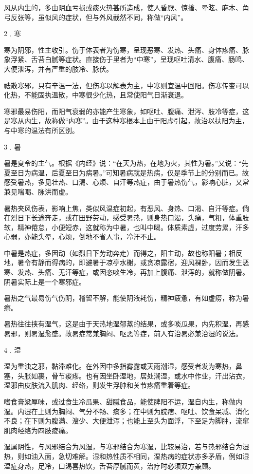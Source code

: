 \documentclass[12pt,UTF8]{ctexbook}
\begin{document}
风从内生的，多由阴血亏损或痰火热甚所造成，使人昏厥、惊搐、晕眩、麻木、角弓反张等，虽似风的症状，但与外风截然不同，称做“内风”。

2﹒寒

寒为阴邪，性主收引。伤于体表者为伤寒，呈现恶寒、发热、头痛、身体疼痛、脉象浮紧、舌苔白腻等症状。直接伤于里者为“中寒”，呈现呕吐清水、腹痛、肠鸣、大便泄泻，并有严重的肢冷、脉伏。

祛散寒邪，只有辛温一法，但伤寒以解表为主，中寒则宜温中回阳。伤寒传变可以化热，不能固执温散，中寒很少化热，且常使阳气日渐衰退。

寒邪最易伤阳，而阳气衰弱的亦能产生寒象，如呕吐、腹痛、泄泻、肢冷等症，这是寒从内生，故称做“内寒”。由于这种寒根本上由于阳虚引起，故治以扶阳为主，与中寒的温法有所区别。

3﹒暑

暑是夏令的主气。根据《内经》说：“在天为热，在地为火，其性为暑。”又说：“先夏至日为病温，后夏至日为病暑。”可知暑病就是热病，仅是季节上的分别而已。故感受暑热，多见壮热、口渴、心烦、自汗等热症，由于暑热伤气，影响心脏，又常兼见喘喝、脉洪而虚。

暑热夹风伤表，影响上焦，类似风温症初起，有恶风、身热、口渴、自汗等症。倘在烈日下长途奔走，或在田野劳动，感受暑热，则身热口渴，头痛，气粗，体重肢软，精神倦怠，小便短赤，这就称为中暑，也叫中暍。体质素虚，过度劳累，汗多心弱，亦能头晕，心烦，倒地不省人事，冷汗不止。

中暑是热症，多因动（如烈日下劳动奔走）而得之，阳主动，故也称阳暑；相反地，暑令有静而得病的，即避暑于凉亭水榭，或贪凉露宿，迎风裸卧，因而发生恶寒、发热、头痛、无汗等症，或因恣啖生冷，再加上腹痛、泄泻的，就称做阴暑。阴暑实际上是一个寒邪症。

暑热之气最易伤气伤阴，稽留不解，能使阴液耗伤，精神疲惫，有如虚痨，称为暑瘵。

暑热往往挟有湿气，这是由于天热地湿郁蒸的结果，或多啖瓜果，内先积湿，再感暑邪，则暑湿愈盛。故暑症常兼胸闷、呕恶等症，前人有治暑必兼治湿的说法。

4﹒湿

湿为重浊之邪，黏滞难化。在外因中多指雾露或天雨潮湿，感受者发为寒热，鼻塞，头胀如裹，骨节痠疼。也有因坐卧湿地，居处潮湿，或水中作业，汗出沾衣，湿邪由皮肤流入肌肉、经络，则发生浮肿和关节疼痛重着等症。

嗜食膏粱厚味，或过食生冷瓜果、甜腻食品，能使脾阳不运，湿自内生，称做内湿。内湿在上则为胸闷、气分不畅、痰多；在中则为脘痞、呕吐、饮食呆减、消化不良；在下则为腹满、溲少、大便泄泻；也能上至头为面浮，下至足为脚肿，流窜肌肉经络为四肢痠痛。

湿属阴性，与风邪结合为风湿，与寒邪结合为寒湿，比较易治，若与热邪结合为湿热，则如油入面，急切难解。湿和热性质不相同，湿热病的症状亦多矛盾，例如湿温症身热，足冷，口渴喜热饮，舌苔厚腻而黄，治疗时必须双方兼顾。
\end{document}
